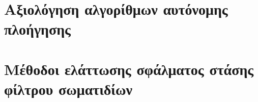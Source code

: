 \chapter{Αξιολόγηση αλγορίθμων αυτόνομης πλοήγησης}
  \label{appendix:01}
  

\chapter{Μέθοδοι ελάττωσης σφάλματος στάσης φίλτρου σωματιδίων}
  \label{appendix:02}
  

